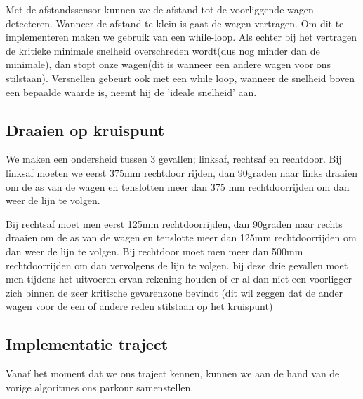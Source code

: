 \documentclass[12pt]{article}
\begin{document}
Met de afstandssensor kunnen we de afstand tot de voorliggende wagen detecteren. Wanneer de afstand te klein is gaat de wagen vertragen. Om dit te implementeren  maken we gebruik van een while-loop. Als echter bij het vertragen de kritieke minimale snelheid overschreden wordt(dus nog minder dan de minimale), dan stopt onze wagen(dit is wanneer een andere wagen voor ons stilstaan). Versnellen gebeurt ook met een while loop, wanneer de snelheid boven een bepaalde waarde is, neemt hij de 'ideale snelheid' aan.

\subsection{Draaien op kruispunt}
We maken een ondersheid tussen 3 gevallen; linksaf, rechtsaf en rechtdoor.
Bij linksaf moeten we eerst 375mm rechtdoor rijden, dan 90graden naar links draaien om de as van de wagen en tenslotten meer dan 375 mm rechtdoorrijden om dan weer de lijn te volgen.

Bij rechtsaf moet men eerst 125mm rechtdoorrijden, dan 90graden naar rechts draaien om de as van de wagen en tenslotte meer dan 125mm rechtdoorrijden om dan weer de lijn te volgen. Bij rechtdoor moet men meer dan 500mm rechtdoorrijden om dan vervolgens de lijn te volgen. bij deze drie gevallen moet men tijdens het uitvoeren ervan rekening houden of er al dan niet een voorligger zich binnen de zeer kritische gevarenzone bevindt (dit wil zeggen dat de ander wagen voor de een of andere reden stilstaan op het kruispunt)


\subsection{Implementatie traject}

Vanaf het moment dat we ons traject kennen, kunnen we aan de hand van de vorige algoritmes ons parkour samenstellen.
\end{document}
